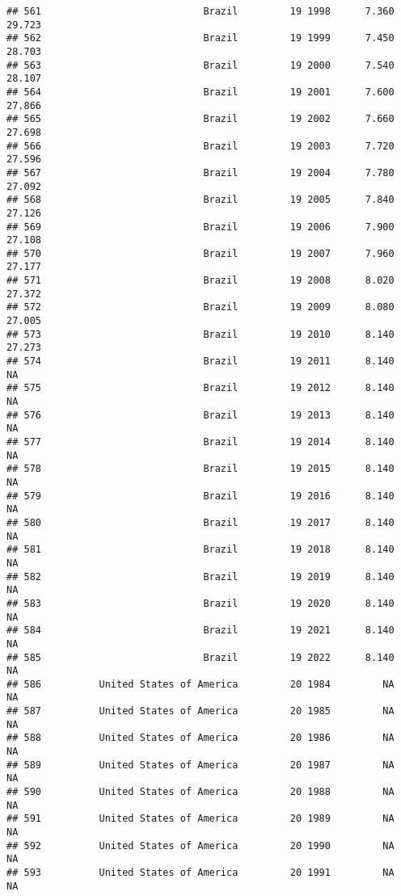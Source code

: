 \documentclass[
]{article}
\begin{document}
\begin{verbatim}
## 561                            Brazil         19 1998      7.360     29.723
## 562                            Brazil         19 1999      7.450     28.703
## 563                            Brazil         19 2000      7.540     28.107
## 564                            Brazil         19 2001      7.600     27.866
## 565                            Brazil         19 2002      7.660     27.698
## 566                            Brazil         19 2003      7.720     27.596
## 567                            Brazil         19 2004      7.780     27.092
## 568                            Brazil         19 2005      7.840     27.126
## 569                            Brazil         19 2006      7.900     27.108
## 570                            Brazil         19 2007      7.960     27.177
## 571                            Brazil         19 2008      8.020     27.372
## 572                            Brazil         19 2009      8.080     27.005
## 573                            Brazil         19 2010      8.140     27.273
## 574                            Brazil         19 2011      8.140         NA
## 575                            Brazil         19 2012      8.140         NA
## 576                            Brazil         19 2013      8.140         NA
## 577                            Brazil         19 2014      8.140         NA
## 578                            Brazil         19 2015      8.140         NA
## 579                            Brazil         19 2016      8.140         NA
## 580                            Brazil         19 2017      8.140         NA
## 581                            Brazil         19 2018      8.140         NA
## 582                            Brazil         19 2019      8.140         NA
## 583                            Brazil         19 2020      8.140         NA
## 584                            Brazil         19 2021      8.140         NA
## 585                            Brazil         19 2022      8.140         NA
## 586          United States of America         20 1984         NA         NA
## 587          United States of America         20 1985         NA         NA
## 588          United States of America         20 1986         NA         NA
## 589          United States of America         20 1987         NA         NA
## 590          United States of America         20 1988         NA         NA
## 591          United States of America         20 1989         NA         NA
## 592          United States of America         20 1990         NA         NA
## 593          United States of America         20 1991         NA         NA

\end{verbatim}
\end{document}
